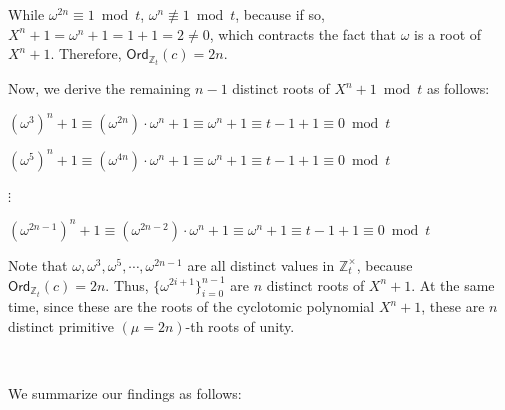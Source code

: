 While $\omega^{2n} \equiv 1 \bmod t$, $\omega^{n} \not\equiv 1 \bmod t$, because if so, $X^n + 1 = \omega^n + 1 = 1 + 1 = 2 \neq 0$, which contracts the fact that $\omega$ is a root of $X^n + 1$. Therefore, $\textsf{Ord}_{\mathbb{Z}_t}(c) = 2n$. 

Now, we derive the remaining $n-1$ distinct roots of $X^n + 1 \bmod t$ as follows:

$(\omega^3)^n + 1 \equiv (\omega^{2n})\cdot \omega^n + 1 \equiv \omega^n + 1 \equiv t - 1 + 1 \equiv 0 \bmod t$

$(\omega^5)^n + 1 \equiv (\omega^{4n})\cdot \omega^n + 1 \equiv \omega^n + 1 \equiv t - 1 + 1 \equiv 0 \bmod t$

$\vdots$

$(\omega^{2n - 1})^n + 1 \equiv (\omega^{2n - 2})\cdot \omega^n + 1 \equiv \omega^n + 1 \equiv t - 1 + 1 \equiv 0 \bmod t$

Note that $\omega, \omega^3, \omega^5, \cdots, \omega^{2n - 1}$ are all distinct values in $\mathbb{Z}_t^{\times}$, because $\textsf{Ord}_{\mathbb{Z}_t}(c) = 2n$. Thus, $\{\omega^{2i + 1}\}_{i=0}^{n-1}$ are $n$ distinct roots of $X^n + 1$. At the same time, since these are the roots of the cyclotomic polynomial $X^n + 1$, these are $n$ distinct primitive $(\mu=2n)$-th roots of unity. 


$ $


We summarize our findings as follows:

